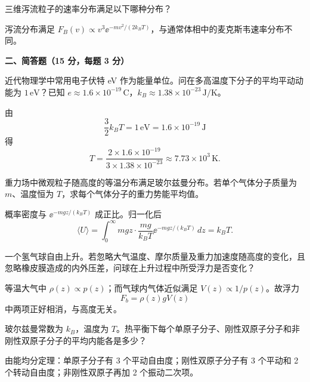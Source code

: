 \begin{question}
三维泻流粒子的速率分布满足以下哪种分布？
\begin{choiceoptions}
\end{choiceoptions}
\begin{solution}
泻流分布满足 $F_B(v)\propto v^3\ee^{-mv^2/(2k_BT)}$，与通常体相中的麦克斯韦速率分布不同。
\end{solution}
\end{question}

\textbf{二、简答题（15 分，每题 3 分）}
\begin{question}
近代物理学中常用电子伏特 eV 作为能量单位。问在多高温度下分子的平均平动动能为 $1\,\mathrm{eV}$？已知 $e\approx1.6\times10^{-19}\,\mathrm{C}$，$k_B\approx1.38\times10^{-23}\,\mathrm{J/K}$。
\begin{solution}
由
\[
\frac32k_BT=1\,\mathrm{eV}=1.6\times10^{-19}\,\mathrm{J}
\]
得
\[
T=\frac{2\times1.6\times10^{-19}}{3\times1.38\times10^{-23}}\approx7.73\times10^3\,\mathrm{K}.
\]
\end{solution}
\end{question}

\begin{question}
重力场中微观粒子随高度的等温分布满足玻尔兹曼分布。若单个气体分子质量为 $m$、温度恒为 $T$，求每个气体分子的重力势能平均值。
\begin{solution}
概率密度与 $\ee^{-mgz/(k_BT)}$ 成正比。归一化后
\[
\langle U\rangle=\int_0^{\infty}mgz\cdot \frac{mg}{k_BT}\ee^{-mgz/(k_BT)}\,dz=k_BT.
\]
\end{solution}
\end{question}

\begin{question}
一个氢气球自由上升。若忽略大气温度、摩尔质量及重力加速度随高度的变化，且忽略橡皮膜造成的内外压差，问球在上升过程中所受浮力是否变化？
\begin{solution}
等温大气中 $\rho(z)\propto p(z)$；而气球内气体近似满足 $V(z)\propto1/p(z)$。故浮力
\[
F_b=\rho(z)gV(z)
\]
中两项正好相消，与高度无关。
\end{solution}
\end{question}

\begin{question}
玻尔兹曼常数为 $k_B$，温度为 $T$。热平衡下每个单原子分子、刚性双原子分子和非刚性双原子分子的平均内能各是多少？
\begin{solution}
由能均分定理：单原子分子有 3 个平动自由度；刚性双原子分子有 3 个平动和 2 个转动自由度；非刚性双原子再加 2 个振动二次项。
\end{solution}
\end{question}

